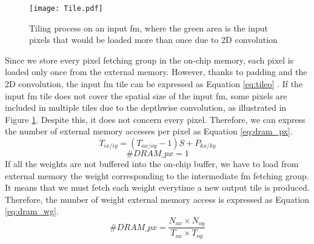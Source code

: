 %
\begin{figure}
    \centering
    \texttt{[image: Tile.pdf]}
    \caption{Tiling process on an input \acrshort{fm}, where the green area is the input pixels that would be loaded more than once due to 2D convolution}
    \label{fig:tilei}
\end{figure}
%
Since we store every pixel fetching group in the on-chip memory, each pixel is loaded only once from the external memory. However, thanks to padding and the 2D convolution, the input \acrshort{fm} tile can be expressed as Equation \eqref{eq:tileo} \cite{ma_optimizing_2018}. If the input \acrshort{fm} tile does not cover the spatial size of the input \acrshort{fm}, some pixels are included in multiple tiles due to the depthwise convolution, as illustrated in Figure \ref{fig:tilei}. Despite this, it does not concern every pixel. Therefore, we can express the number of external memory accesses per pixel as Equation \eqref{eq:dram_px}.
%
\begin{equation}
    T_{ix/iy} = \left( T_{ox/oy} - 1\right) S + P_{kx/ky}
    \label{eq:tileo}
\end{equation}
\begin{equation}
    \#DRAM\_px = 1
    \label{eq:dram_px}
\end{equation}
%
If all the weights are not buffered into the on-chip buffer, we have to load from external memory the weight corresponding to the intermediate \acrshort{fm} fetching group. It means that we must fetch each weight everytime a new output tile is produced. Therefore, the number of weight external memory access is expressed as Equation \eqref{eq:dram_wg}.
%
\begin{equation}
    \#DRAM\_px = \frac{N_{ox} \times N_{oy}}{T_{ox} \times T_{oy}}
    \label{eq:dram_wg}
\end{equation}
%

